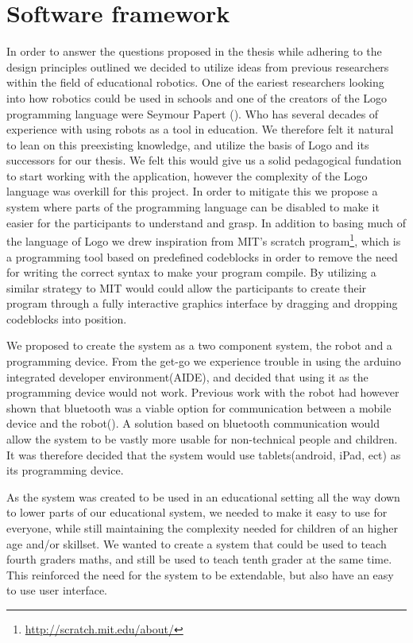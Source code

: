 \section{Software framework}\label{sec:framework}
In order to answer the questions proposed in the thesis while adhering to the design principles outlined we decided to utilize ideas from previous researchers within the field of educational robotics. 
One of the eariest researchers looking into how robotics could be used in schools and one of the creators of the Logo programming language were Seymour Papert (\cite{papert1980mindstorms}). Who has several decades of experience with using robots as a tool in education.
We therefore felt it natural to lean on this preexisting knowledge, and utilize the basis of Logo and its successors for our thesis. We felt this would give us a solid pedagogical fundation to start working with the application, however the complexity of the Logo language was overkill for this project. In order to mitigate this we propose a system where parts of the programming language can be disabled to make it easier for the participants to understand and grasp. In addition to basing much of the language of Logo we drew inspiration from MIT's scratch program\footnote{\url{http://scratch.mit.edu/about/}}, which is a programming tool based on predefined codeblocks in order to remove the need for writing the correct syntax to make your program compile. By utilizing a similar strategy to MIT would could allow the participants to create their program through a fully interactive graphics interface by dragging and dropping codeblocks into position. 

\bigskip\noindent
We proposed to create the system as a two component system, the \chirp robot and a programming device. 
From the get-go we experience trouble in using the arduino integrated developer environment(AIDE), and decided that using it as the programming device would not work.
Previous work with the robot had however shown that bluetooth was a viable option for communication between a mobile device and the robot(\cite{chrip2013ResearcherNight}).
A solution based on bluetooth communication would allow the system to be vastly more usable for non-technical people and children.
It was therefore decided that the system would use tablets(android, iPad, ect) as its programming device.

\bigskip\noindent
As the system was created to be used in an educational setting all the way down to lower parts of our educational system, 
we needed to make it easy to use for everyone, while still maintaining the complexity needed for children of an higher age and/or skillset. 
We wanted to create a system that could be used to teach fourth graders maths, and still be used to teach tenth grader at the same time. 
This reinforced the need for the system to be extendable, but also have an easy to use user interface. 
	

